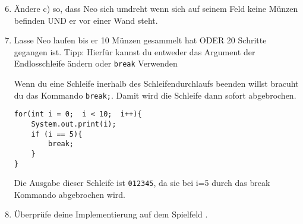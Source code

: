 \begin{enumerate}\setcounter{enumi}{5}
	\item
		Ändere c) so, dass Neo sich umdreht wenn sich auf seinem Feld keine Münzen befinden UND er vor einer Wand steht.

	\item
		Lasse Neo laufen bis er 10 Münzen gesammelt hat ODER 20 Schritte gegangen ist.
		Tipp: Hierfür kannst du entweder das Argument der Endlosschleife ändern oder \lstinline{break} Verwenden

		\begin{Infobox}[Break]
			Wenn du eine Schleife inerhalb des Schleifendurchlaufs beenden willst bracuht du das Kommando \lstinline{break;}. 
			Damit wird die Schleife dann sofort abgebrochen.

			\begin{lstlisting}
for(int i = 0;  i < 10;  i++){
	System.out.print(i);
	if (i == 5){
		break;
	}
}
			\end{lstlisting}

			Die Ausgabe dieser Schleife ist \lstinline{012345}, da sie bei i=5 durch das break Kommando abgebrochen wird.
		\end{Infobox}

	\item
		Überprüfe deine Implementierung auf dem Spielfeld .
\end{enumerate}
\newpage
